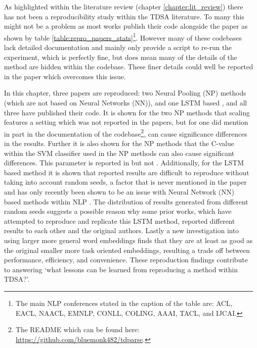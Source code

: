 As highlighted within the literature review (chapter \ref{chapter:lit_review}) there has not been a reproducibility study within the TDSA literature. To many this might not be a problem as most works publish their code alongside the paper as shown by table \ref{table:repro_papers_stats}\footnote{The main NLP conferences stated in the caption of the table are: ACL, EACL, NAACL, EMNLP, CONLL, COLING, AAAI, TACL, and IJCAI.}. However many of these codebases lack detailed documentation and mainly only provide a script to re-run the experiment, which is perfectly fine, but does mean many of the details of the method are hidden within the codebase. These finer details could well be reported in the paper which overcomes this issue. 

In this chapter, three papers are reproduced: two Neural Pooling (NP) methods \citep{vo2015target, wang-etal-2017-tdparse} (which are not based on Neural Networks (NN)), and one LSTM based \citep{tang-etal-2016-effective}, and all three have published their code. It is shown for the two NP methods that scaling features a setting which was not reported in the papers, but for one \citep{wang-etal-2017-tdparse} did mention in part in the documentation of the codebase\footnote{The README which can be found here: \url{https://github.com/bluemonk482/tdparse}.}, can cause significance differences in the results. Further it is also shown for the NP methods that the C-value within the SVM classifier used in the NP methods can also cause significant differences. This parameter is reported in \citet{vo2015target} but not \citet{wang-etal-2017-tdparse}. Additionally, for the LSTM based method it is shown that reported results are difficult to reproduce without taking into account random seeds, a factor that is never mentioned in the paper and has only recently been shown to be an issue with Neural Network (NN) based methods within NLP \citep{reimers-gurevych-2017-reporting}. The distribution of results generated from different random seeds suggests a possible reason why some prior works, which have attempted to reproduce \citep{tay2018learning} and replicate \citep{chen-etal-2017-recurrent} this LSTM method, reported different results to each other and the original authors. Lastly a new investigation into using larger more general word embeddings finds that they are at least as good as the original smaller more task oriented embeddings, resulting a trade off between performance, efficiency, and convenience. These reproduction findings contribute to answering  `what lessons can be learned from reproducing a method within TDSA?'.


